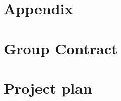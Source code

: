 \newpage
\appendix
\section*{Appendix}
\setcounter{section}{0}
\renewcommand{\thesection}{\Alph{section}}

\section{Group Contract}
\label{app:group-contract}




\section{Project plan}




